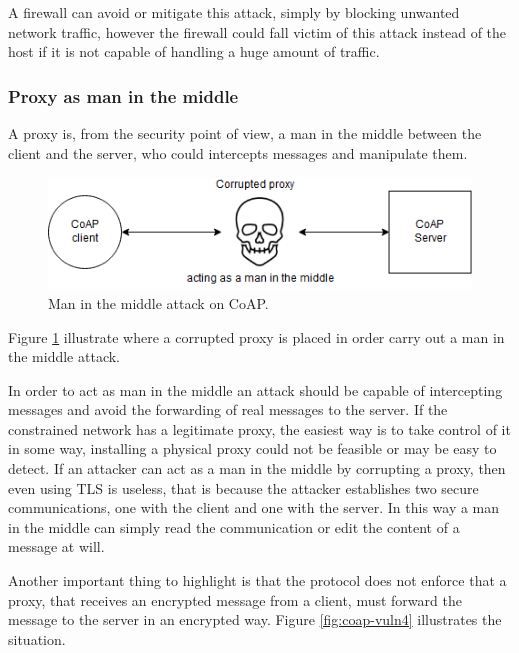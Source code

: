 	A firewall can avoid or mitigate this attack, simply by blocking unwanted network traffic, however the firewall could fall victim of this attack instead of the host if it is not capable of handling a huge amount of traffic.\newline
	
	\subsubsection{Proxy as man in the middle}
	A proxy is, from the security point of view, a man in the middle between the client and the server, who could intercepts messages and manipulate them.
	
	\begin{figure}
		\includegraphics[width=\linewidth]{coap-vuln-img3.png}
		\caption{Man in the middle attack on CoAP.}
		\label{fig:coap-vuln3}
	\end{figure}
	
	Figure \ref{fig:coap-vuln3} illustrate where a corrupted proxy is placed in order carry out a man in the middle attack.\newline
	
	In order to act as man in the middle an attack should be capable of intercepting messages and avoid the forwarding of real messages to the server.\newline
	If the constrained network has a legitimate proxy, the easiest way is to take control of it in some way, installing a physical proxy could not be feasible or may be easy to detect.\newline
	If an attacker can act as a man in the middle by corrupting a proxy, then even using TLS is useless, that is because the attacker establishes two secure communications, one with the client and one with the server.\newline
	In this way a man in the middle can simply read the communication or edit the content of a message at will.\newline
	
	Another important thing to highlight is that the protocol does not enforce that a proxy, that receives an encrypted message from a client, must forward the message to the server in an encrypted way.
	Figure \ref{fig:coap-vuln4} illustrates the situation.\newline
	
